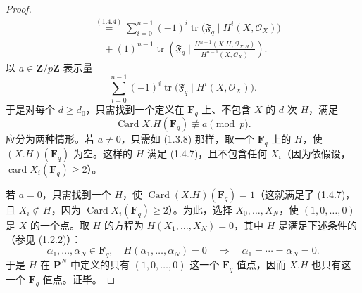 \begin{proof}
\[\begin{aligned}
 &\overset{(1.4.4)}{=}
 \sum_{i=0}^{n-1}(-1)^i\operatorname{tr}
 \bigl(\mathfrak F_q\mid H^i(X,\mathcal O_X)\bigr)\\
 &\quad +(1)^{n-1}\operatorname{tr}\left(\mathfrak F_q\mid
 \frac{H^{n-1}(X.H,\mathcal O_{X.H})}{H^{n-1}(X,\mathcal O_X)}\right).
\end{aligned}
\tag{1.4.6}
\]
以 $a\in\mathbf Z/p\mathbf Z$ 表示量
\[
 \sum_{i=0}^{n-1}(-1)^i\operatorname{tr}
 \bigl(\mathfrak F_q\mid H^i(X,\mathcal O_X)\bigr).
\]
于是对每个 $d\geq d_0$，只需找到一个定义在 $\mathbf F_q$ 上、不包含 $X$ 的 $d$ 次 $H$，满足
\[
 \operatorname{Card}X.H(\mathbf F_q)\not\equiv a\pmod p.
 \tag{1.4.7}
\]
应分为两种情形。若 $a\ne0$，只需如 (1.3.8) 那样，取一个 $\mathbf F_q$ 上的 $H$，使 $(X.H)(\mathbf F_q)$ 为空。这样的 $H$ 满足 (1.4.7)，且不包含任何 $X_i$（因为依假设，$\operatorname{card}X_i(\mathbf F_q)\geq2$）。

若 $a=0$，只需找到一个 $H$，使 $\operatorname{Card}(X.H)(\mathbf F_q)=1$（这就满足了 (1.4.7)，且 $X_i\not\subset H$，因为 $\operatorname{Card}X_i(\mathbf F_q)\geq2$）。为此，选择 $X_0,\ldots,X_N$，使 $(1,0,\ldots,0)$ 是 $X$ 的一个点。取 $H$ 的方程为 $H(X_1,\ldots,X_N)=0$，其中 $H$ 是满足下述条件的（参见 (1.2.2)）：
\[
 \alpha_1,\ldots,\alpha_N\in\mathbf F_q,\quad
 H(\alpha_1,\ldots,\alpha_N)=0
 \quad\Longrightarrow\quad\alpha_1=\cdots=\alpha_N=0.
 \tag{1.4.8}
\]
于是 $H$ 在 $\mathbf P^N$ 中定义的只有 $(1,0,\ldots,0)$ 这一个 $\mathbf F_q$ 值点，因而 $X.H$ 也只有这一个 $\mathbf F_q$ 值点。证毕。
\end{proof}

